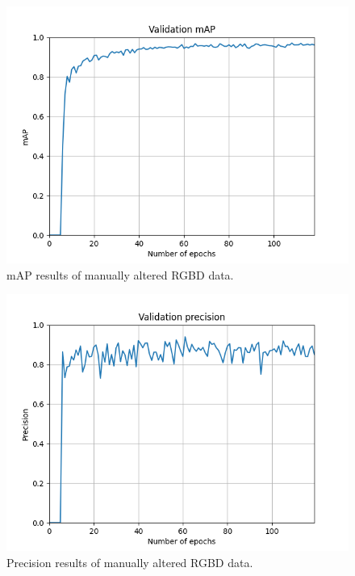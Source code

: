 \documentclass[twoside]{ctuthesis}
\theoremstyle{plain}
\theoremstyle{definition}
\theoremstyle{note}
\begin{document}
\begin{figure}[h!]
	\centering
	\includegraphics[width=\textwidth]{run-s2d_50filter-tag-validation_mAP.png}
	\caption{mAP results of manually altered RGBD data.}
\end{figure}
\pagebreak
\begin{figure}[h!]
	\centering
	\includegraphics[width=\textwidth]{run-s2d_50filter-tag-validation_precision.png}
	\caption{Precision results of manually altered RGBD data.}
\end{figure}
\end{document}
